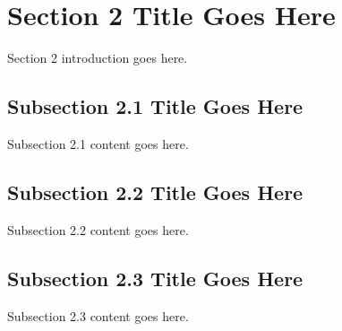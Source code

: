 \section{Section 2 Title Goes Here}\label{sec:2}
Section 2 introduction goes here.

\subsection{Subsection 2.1 Title Goes Here}\label{subsec:2.1}
Subsection 2.1 content goes here.

\subsection{Subsection 2.2 Title Goes Here}\label{subsec:2.2}
Subsection 2.2 content goes here.

\subsection{Subsection 2.3 Title Goes Here}\label{subsec:2.3}
Subsection 2.3 content goes here.
